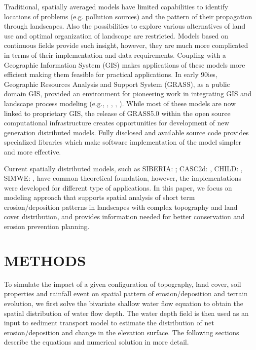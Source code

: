 \documentclass[fleqn,12pt,twoside]{article}
\begin{document}
Traditional, spatially averaged models 
have limited capabilities to identify locations of problems
(e.g. pollution sources) and the pattern of their propagation through landscapes.
Also the possibilities to explore various alternatives of land use and optimal
organization of landscape are restricted.
Models based on continuous fields provide such insight,
however, they are much more complicated in terms of their implementation
and data requirements. Coupling with a Geographic Information System (GIS)
makes applications of these models more efficient making them feasible 
for practical applications.
In early 90ies, Geographic Resources Analysis and Support System (GRASS),
 as a public domain GIS,  provided an environment
for pioneering work in integrating GIS and landscape process modeling
(e.g., \cite{answers91}, \cite{swat94}, \cite{saghafian96}, \cite{vieux96}).
While most of these models are now linked to proprietary GIS,
the release of GRASS5.0 within the open source computational infrastructure \cite{grassbook}
creates opportunities for development of new generation distributed models. 
Fully disclosed and available source code provides
specialized libraries which make software implementation of the model simpler
and more effective.

Current spatially distributed models, such as SIBERIA: \cite{siberia95};
CASC2d: \cite{casc2d95}, CHILD: \cite{child01},
SIMWE: \cite{mitwrr98},   have common theoretical foundation,
however, the implementations were developed for different type of applications.
In this paper, we focus on modeling approach that supports spatial analysis
of short term erosion/deposition patterns in landscapes 
with complex topography and land cover distribution, and provides information 
needed for better conservation and erosion prevention planning.



\section{METHODS}

To simulate the impact of a given configuration of topography, land cover,
soil properties and rainfall event on spatial pattern of erosion/deposition
and terrain evolution, we first solve the bivariate shallow water flow
equation to obtain the spatial distribution of water flow depth. 
The water depth field is then used as an 
input to sediment transport model to estimate the distribution 
of net erosion/deposition and change in the elevation surface. 
The following sections describe the equations 
and numerical solution in more detail.
\end{document}
